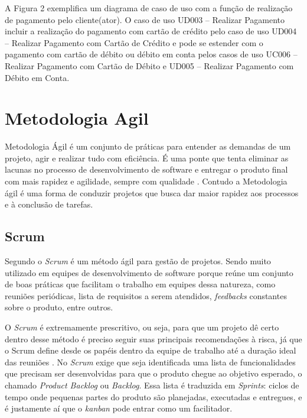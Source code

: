     A Figura 2 exemplifica um diagrama de caso de uso com a função de realização de pagamento pelo cliente(ator). O caso de uso UD003 – Realizar Pagamento incluir a realização do pagamento com cartão de crédito pelo caso de uso UD004 – Realizar Pagamento com Cartão de Crédito e pode se estender com o pagamento com cartão de débito ou débito em conta pelos casos de uso UC006 – Realizar Pagamento com Cartão de Débito e UD005 – Realizar Pagamento com Débito em Conta.

    
\section{Metodologia Agil}

    Metodologia Ágil é um conjunto de práticas para entender as demandas de um projeto, agir e realizar tudo com eficiência. É uma ponte que tenta eliminar as lacunas no processo de desenvolvimento de software e entregar o produto final com mais rapidez e agilidade, sempre com qualidade \cite{jonatan}. Contudo a Metodologia ágil é uma forma de conduzir projetos que busca dar maior rapidez aos processos e à conclusão de tarefas.
        
        
\subsection{Scrum}

     Segundo  o \textit{Scrum} é um método ágil para gestão de projetos. Sendo muito utilizado em equipes de desenvolvimento de software porque reúne um conjunto de boas práticas que facilitam o trabalho em equipes dessa natureza, como reuniões periódicas, lista de requisitos a serem atendidos, \textit{feedbacks} constantes sobre o produto, entre outros.
    
    O \textit{Scrum} é extremamente prescritivo, ou seja, para que um projeto dê certo dentro desse método é preciso seguir suas principais recomendações à risca, já que o Scrum define desde os papéis dentro da equipe de trabalho até a duração ideal das reuniões \cite{kanban}. No \textit{Scrum} exige que seja identificada uma lista de funcionalidades que precisam ser desenvolvidas para que o produto chegue ao objetivo esperado, o chamado \textit{Product Backlog} ou \textit{Backlog}. Essa lista é traduzida em \textit{Sprints}: ciclos de tempo onde pequenas partes do produto são planejadas, executadas e entregues, e é justamente aí que o \textit{kanban} pode entrar como um facilitador.

